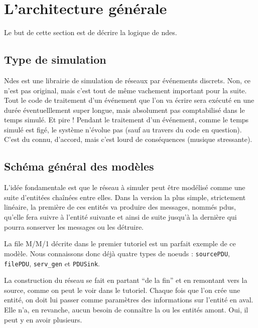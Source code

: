 %
\section{L'architecture générale}
\label{section:architecture}

   Le but de cette section est de décrire la logique de {\sc
ndes}.

%
\subsection{Type de simulation}

   {\sc Ndes} est une librairie de simulation de réseaux par événements
discrets. Non, ce n'est pas original, mais c'est tout de même
vachement important pour la suite. Tout le code de traitement d'un
événement que l'on va écrire sera exécuté en une durée éventuelllement
super longue, mais absolument pas comptabilisé dans le temps
simulé. Et pire ! Pendant le traitement d'un événement, comme le temps
simulé est figé, le système n'évolue pas (sauf au travers du code en
question). C'est du connu, d'accord, mais c'est lourd de conséquences
(musique stressante).

%
\subsection{Schéma général des modèles}

   L'idée fondamentale est que le réseau à simuler peut être
modélisé comme une suite d'entitées chaînées entre elles. Dans la
version la plus simple, strictement linéaire, la première de ces
entités va produire des messages, nommés {\sc pdu}s, qu'elle fera
suivre à l'entité suivante et ainsi de suite jusqu'à la dernière qui
pourra sonserver les messages ou les détruire.

   La file M/M/1 décrite dans le premier tutoriel est un parfait
exemple de ce modèle. Nous connaissons donc déjà quatre types de
noeuds : {\tt sourcePDU}, {\tt filePDU}, {\tt serv\_gen} et {\tt PDUSink}.

   La construction du réseau se fait en partant ``de la fin'' et en
remontant vers la source, comme on peut le voir dans le
tutoriel. Chaque fois que l'on crée une entité, on doit lui passer
comme paramètres des informations sur l'entité en aval. Elle n'a, en
revanche, aucun besoin de connaître la ou les entités amont. Oui, il
peut y en avoir plusieurs.

